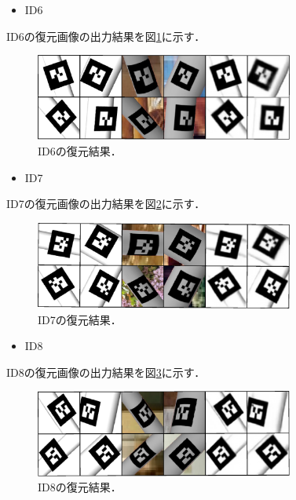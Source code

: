 \begin{itemize}
\item  ID6
\end{itemize}

ID6の復元画像の出力結果を図\ref{i6}に示す．

      \begin{figure}[htbp]
      \begin{center}
      \includegraphics[width=85mm]{figure/eps/F7.eps}
      \caption{ID6の復元結果．}
      \label{i6}
      \end{center}
      \end{figure}

\newpage
\begin{itemize}
\item  ID7
\end{itemize}

ID7の復元画像の出力結果を図\ref{i7}に示す．

      \begin{figure}[htbp]
      \begin{center}
      \includegraphics[width=85mm]{figure/eps/F8.eps}
      \caption{ID7の復元結果．}
      \label{i7}
      \end{center}
      \end{figure}



\begin{itemize}
\item  ID8
\end{itemize}

ID8の復元画像の出力結果を図\ref{i8}に示す．

      \begin{figure}[htbp]
      \begin{center}
      \includegraphics[width=85mm]{figure/eps/F9.eps}
      \caption{ID8の復元結果．}
      \label{i8}
      \end{center}
      \end{figure}


